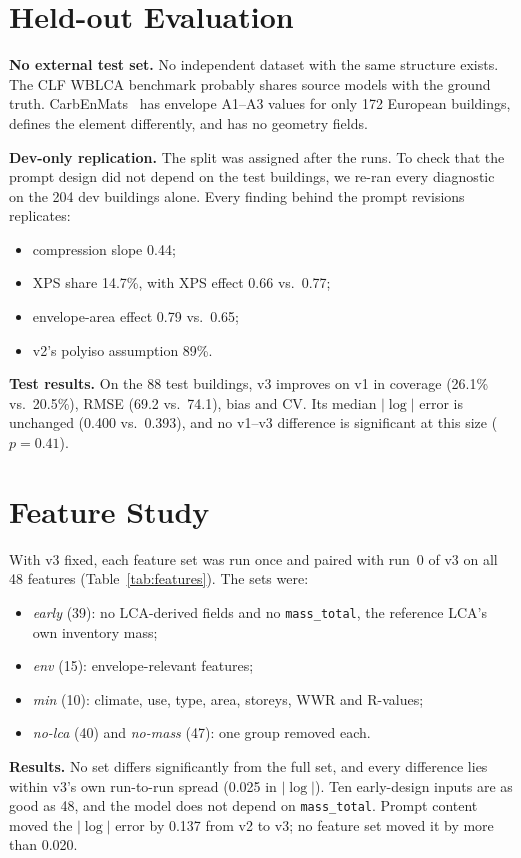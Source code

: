 \documentclass[10pt,letterpaper]{article}
\begin{document}
\section{Held-out Evaluation}
\textbf{No external test set.} No independent dataset with the same structure exists. The CLF WBLCA benchmark probably shares source models with the ground truth. CarbEnMats~\cite{carbenmats} has envelope A1--A3 values for only 172 European buildings, defines the element differently, and has no geometry fields.

\textbf{Dev-only replication.} The split was assigned after the runs. To check that the prompt design did not depend on the test buildings, we re-ran every diagnostic on the 204 dev buildings alone. Every finding behind the prompt revisions replicates:
\begin{itemize}
\item compression slope 0.44;
\item XPS share 14.7\%, with XPS effect 0.66 vs.\ 0.77;
\item envelope-area effect 0.79 vs.\ 0.65;
\item v2's polyiso assumption 89\%.
\end{itemize}

\textbf{Test results.} On the 88 test buildings, v3 improves on v1 in coverage (26.1\% vs.\ 20.5\%), RMSE (69.2 vs.\ 74.1), bias and CV. Its median $|\log|$ error is unchanged (0.400 vs.\ 0.393), and no v1--v3 difference is significant at this size ($p=0.41$).

\section{Feature Study}
With v3 fixed, each feature set was run once and paired with run~0 of v3 on all 48 features (Table~\ref{tab:features}). The sets were:
\begin{itemize}
\item \emph{early} (39): no LCA-derived fields and no \texttt{mass\_total}, the reference LCA's own inventory mass;
\item \emph{env} (15): envelope-relevant features;
\item \emph{min} (10): climate, use, type, area, storeys, WWR and R-values;
\item \emph{no-lca} (40) and \emph{no-mass} (47): one group removed each.
\end{itemize}

\textbf{Results.} No set differs significantly from the full set, and every difference lies within v3's own run-to-run spread (0.025 in $|\log|$). Ten early-design inputs are as good as 48, and the model does not depend on \texttt{mass\_total}. Prompt content moved the $|\log|$ error by 0.137 from v2 to v3; no feature set moved it by more than 0.020.
\end{document}

